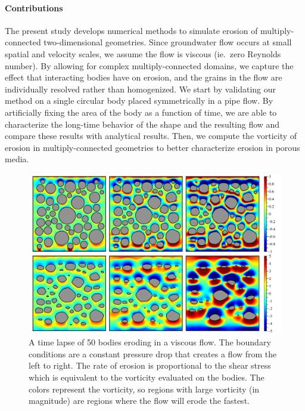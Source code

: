 \documentclass[preprint, 10pt]{elsarticle}
\begin{document}
\paragraph{Contributions} The present study develops numerical methods
to simulate erosion of multiply-connected two-dimensional geometries.
Since groundwater flow occurs at small spatial and velocity scales, we
assume the flow is viscous (ie.~zero Reynolds number).  By allowing for
complex multiply-connected domains, we capture the effect that
interacting bodies have on erosion, and the grains in the flow are
individually resolved rather than homogenized.  We start by validating
our method on a single circular body placed symmetrically in a pipe
flow.  By artificially fixing the area of the body as a function of
time, we are able to characterize the long-time behavior of the shape
and the resulting flow and compare these results with analytical
results.  Then, we compute the vorticity of erosion in
multiply-connected geometries to better characterize erosion in porous
media. 

\begin{figure}%
\begin{center}
\includegraphics[width = 0.9 \textwidth]{./figs/50bod.pdf}
\caption{\label{fig:50bodies} A time lapse of 50 bodies eroding in a
viscous flow.  The boundary conditions are a constant pressure drop that
creates a flow from the left to right.  The rate of erosion is
proportional to the shear stress which is equivalent to the vorticity
evaluated on the bodies.  The colors represent the vorticity, so regions
with large vorticity (in magnitude) are regions where the flow will
erode the fastest.}
\end{center}
\end{figure}
\end{document}
